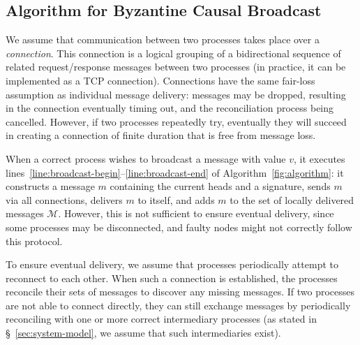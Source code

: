 \documentclass[a4paper,anonymous,USenglish]{lipics-v2019}
\begin{document}
\subsection{Algorithm for Byzantine Causal Broadcast}\label{sec:algorithm1}

We assume that communication between two processes takes place over a \emph{connection}.
This connection is a logical grouping of a bidirectional sequence of related request/response messages between two processes (in practice, it can be implemented as a TCP connection).
Connections have the same fair-loss assumption as individual message delivery: messages may be dropped, resulting in the connection eventually timing out, and the reconciliation process being cancelled.
However, if two processes repeatedly try, eventually they will succeed in creating a connection of finite duration that is free from message loss.

When a correct process wishes to broadcast a message with value $v$, it executes lines~\ref{line:broadcast-begin}--\ref{line:broadcast-end} of Algorithm~\ref{fig:algorithm}: it constructs a message $m$ containing the current heads and a signature, sends $m$ via all connections, delivers $m$ to itself, and adds $m$ to the set of locally delivered messages $\mathcal{M}$.
However, this is not sufficient to ensure eventual delivery, since some processes may be disconnected, and faulty nodes might not correctly follow this protocol.

To ensure eventual delivery, we assume that processes periodically attempt to reconnect to each other.
When such a connection is established, the processes reconcile their sets of messages to discover any missing messages.
If two processes are not able to connect directly, they can still exchange messages by periodically reconciling with one or more correct intermediary processes (as stated in \S~\ref{sec:system-model}, we assume that such intermediaries exist).
\end{document}
